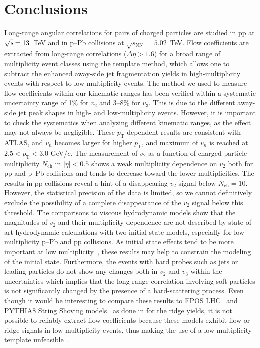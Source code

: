 
\section{Conclusions}
\label{sec:summary}
Long-range angular correlations for pairs of charged particles are studied in pp at ${\sqrt{{\textit s}}}=13$~TeV and in p--Pb collisions at $\sqrt{s_\mathrm{NN}} = 5.02$~TeV. Flow coefficients are extracted from long-range correlations ($\Delta\eta > 1.6$) for a broad range of multiplicity event classes using the template method, which allows one to subtract the enhanced away-side jet fragmentation yields in high-multiplicity events with respect to low-multiplicity events. The method we used to measure flow coefficients within our kinematic ranges has been verified within a systematic uncertainty range of 1\% for $v_{2}$ and 3--8\% for $v_{3}$. This is due to the different away-side jet peak shapes in high- and low-multiplicity events. However, it is important to check the systematics when analyzing different kinematic ranges, as the effect may not always be negligible.
These $p_\mathrm{T}$ dependent results are consistent with ATLAS, and $v_n$ becomes larger for higher $p_\mathrm{T}$, and maximum of $v_n$ is reached at $2.5<p_\mathrm{T}<3.0$ GeV/$c$. 
The measurement of $v_2$ as a function of charged particle multiplicity $N_{\mathrm{ch}}$ in $|\eta|<0.5$ shows a weak multiplicity dependence on $v_2$ both for pp and p--Pb collisions and tends to decrease toward the lower multiplicities. The results in pp collisions reveal a hint of a disappearing $v_2$ signal below $N_{\mathrm{ch}} = 10$. However, the statistical precision of the data is limited, so we cannot definitively exclude the possibility of a complete disappearance of the $v_2$ signal below this threshold. 
The comparisons to viscous hydrodynamic models show that the magnitudes of $v_2$ and their multiplicity dependence are not described by state-of-art hydrodynamic calculations with two initial state models, especially for low-multiplicity p--Pb and pp collisions. As initial state effects tend to be more important at low multiplicity~\cite{Greif:2017bnr,Moreland:2018gsh}, these results may help to constrain the modeling of the initial state.
Furthermore, the events with hard probes such as jets or leading particles do not show any changes both in $v_2$ and $v_3$ within the uncertainties which implies that the long-range correlation involving soft particles is not significantly changed by the presence of a hard-scattering process. 
Even though it would be interesting to compare these results to EPOS LHC~\cite{Pierog:2013ria} and PYTHIA8 String Shoving models~\cite{Bierlich:2017vhg,Bierlich:2019ixq} as done in \cite{ALICE:2012eyl} for the ridge yields, it is not possible to reliably extract flow coefficients because these models exhibit flow or ridge signals in low-multiplicity events, thus making the use of a low-multiplicity template unfeasible~\cite{Ji:2023eqn}.

